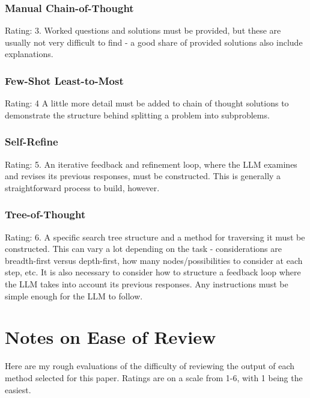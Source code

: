 \documentclass[11pt]{article}
\begin{document}
\subsubsection*{Manual Chain-of-Thought}

Rating: 3. Worked questions and solutions must be provided, but these are usually not very difficult to find - a good share of provided solutions also include explanations.

\subsubsection*{Few-Shot Least-to-Most}

Rating: 4 A little more detail must be added to chain of thought solutions to demonstrate the structure behind splitting a problem into subproblems.

\subsubsection*{Self-Refine}

Rating: 5. An iterative feedback and refinement loop, where the LLM examines and revises its previous responses, must be constructed. This is generally a straightforward process to build, however.

\subsubsection*{Tree-of-Thought}

Rating: 6. A specific search tree structure and a method for traversing it must be constructed. This can vary a lot depending on the task - considerations are breadth-first versus depth-first, how many nodes/possibilities to consider at each step, etc. It is also necessary to consider how to structure a feedback loop where the LLM takes into account its previous responses. Any instructions must be simple enough for the LLM to follow.

\clearpage
\newpage

\section{Notes on Ease of Review}
\label{sec:ease_of_review}

Here are my rough evaluations of the difficulty of reviewing the output of each method selected for this paper. Ratings are on a scale from 1-6, with 1 being the easiest.
\end{document}
